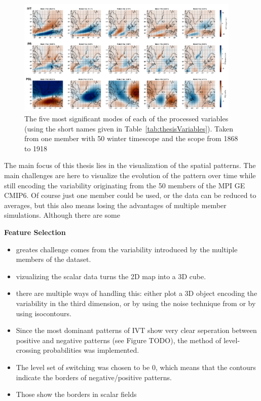 \begin{figure}[htb]
  \begin{center}
    \includegraphics[width=0.95\textwidth]{figures/top5_spatial_modes_ivt_psl_pr_mem11_scope20.png}
  \end{center}
  \caption{The five most significant modes of each of the processed variables (using the short names given in Table~\ref{tab:thesisVariables}). Taken from one member with 50 winter timescope and the scope from 1868 to 1918}
  \label{fig:5modes each variable}
\end{figure}


The main focus of this thesis lies in the visualization of the spatial patterns. 
The main challenges are here to visualize the evolution of the pattern over time while still encoding the variability originating from the 50 members of the MPI GE CMIP6. 
Of course just one member could be used, or the data can be reduced to averages, but this also means losing the advantages of multiple member simulations. 
Although there are some 

\textbf{Feature Selection}


\begin{itemize}
  \item greates challenge comes from the variability introduced by the multiple members of the dataset. 
  \item vizualizing the scalar data turns the 2D map into a 3D cube. 
  \item there are multiple ways of handling this: either plot a 3D object encoding the variability in the third dimension, or by using the noise technique from  or by using isocontours. 
  \item Since the most dominant patterns of IVT show very clear seperation between positive and negative patterns (see Figure TODO), the method of level-crossing probabilities \cite{poethkow_approximate_2013} was implemented.  
  \item The level set of switching was chosen to be 0, which means that the contours indicate the borders of negative/positive patterns.  \item Those show the borders in scalar fields
\end{itemize}


